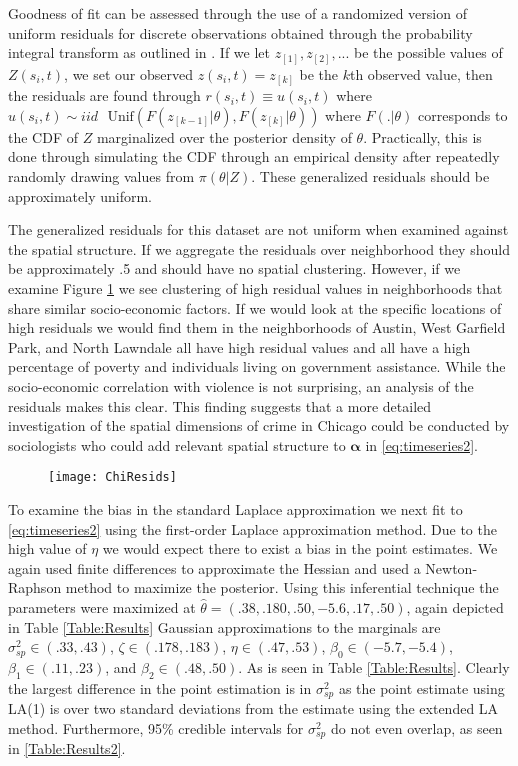 \documentclass[11pt]{isuthesis}
\begin{document}
	Goodness of fit can be assessed through the use of a randomized version of uniform residuals for discrete observations obtained through the probability integral transform as outlined in \cite{brillinger1982maximum}.  If we let $z_{[1]},z_{[2]},...$ be the possible values of $Z(s_i,t)$, we set our observed $z(s_i,t)=z_{[k]}$ be the $k$th observed value, then the residuals are found through $r(s_i,t)\equiv u(s_i,t)$ where $u(s_i,t)\sim iid\text{ }\mbox{Unif}(F(z_{[k-1]}|\theta),F(z_{[k]}|\theta))$ where $F(.|\theta)$ corresponds to the CDF of $Z$ marginalized over the posterior density of $\theta$.  Practically, this is done through simulating the CDF through an empirical density after repeatedly randomly drawing values from $\pi(\theta|Z)$.  These generalized residuals should be approximately uniform.
	
	The generalized residuals for this dataset are not uniform when examined against the spatial structure.  If we aggregate the residuals over neighborhood they should be approximately .5 and should have no spatial clustering.  However, if we examine Figure \ref{fig:resids} we see clustering of high residual values in neighborhoods that share similar socio-economic factors.  If we would look at the specific locations of high residuals we would find them in the neighborhoods of Austin, West Garfield Park, and North Lawndale all have high residual values and all have a high percentage of poverty and individuals living on government assistance.  While the socio-economic correlation with violence is not surprising, an analysis of the residuals makes this clear.  This finding suggests that a more detailed investigation of the spatial dimensions of crime in Chicago could be conducted by sociologists who could add relevant spatial structure to $\boldsymbol{\alpha}$ in \eqref{eq:timeseries2}.
	
	
	\begin{figure}[!htp]
		\centering
		\texttt{[image: ChiResids]}
		\label{fig:resids}
	\end{figure}
	
	To examine the bias in the standard Laplace approximation we next fit to \eqref{eq:timeseries2} using the first-order Laplace approximation method.  Due to the high value of $\eta$ we would expect there to exist a bias in the point estimates.  We again used finite differences to approximate the Hessian and used a Newton-Raphson method to maximize the posterior.  Using this inferential technique the parameters were maximized at $\hat{\theta}=(.38,.180,.50,-5.6,.17,.50)$, again depicted in Table \ref{Table:Results}  Gaussian approximations to the marginals are $\sigma_{sp}^2 \in (.33,.43)$, $\zeta \in (.178,.183)$, $\eta \in (.47,.53)$, $\beta_0 \in (-5.7,-5.4)$, $\beta_1 \in (.11,.23)$, and $\beta_2 \in (.48,.50)$.  As is seen in Table \ref{Table:Results}.  Clearly the largest difference in the point estimation is in $\sigma_{sp}^2$ as the point estimate using LA(1) is over two standard deviations from the estimate using the extended LA method.  Furthermore, 95\% credible intervals for $\sigma_{sp}^2$ do not even overlap, as seen in \ref{Table:Results2}.
	
\end{document}
